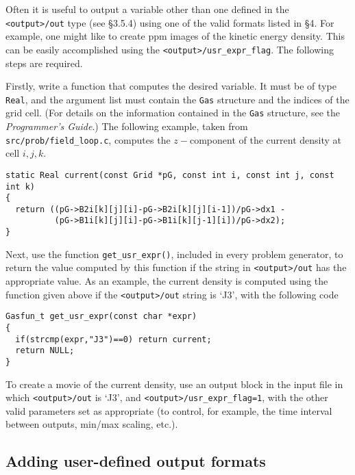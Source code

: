 Often it is useful to output a variable other than one defined in the {\tt <output>/out} type
(see \S3.5.4)  using one of the valid formats listed in \S4.  For example,
one might like to create ppm images of the kinetic energy density.  This
can be easily accomplished using the {\tt <output>/usr\_expr\_flag}.  The
following steps are required.

Firstly, write a function that computes the desired variable.  It must be of
type {\tt Real}, and the argument list must contain the {\tt Gas}
structure and the indices of the grid cell.
(For details on the information contained in the {\tt Gas}
structure, see the {\it Programmer's Guide}.)
The following example, taken from {\tt src/prob/field\_loop.c}, computes the
$z-$component of the current density at cell $i,j,k$.
\begin{verbatim}
static Real current(const Grid *pG, const int i, const int j, const int k)
{
  return ((pG->B2i[k][j][i]-pG->B2i[k][j][i-1])/pG->dx1 -
          (pG->B1i[k][j][i]-pG->B1i[k][j-1][i])/pG->dx2);
}
\end{verbatim}

Next, use the function {\tt get\_usr\_expr()}, included in every
problem generator, to return the value computed by this function if the
string in {\tt <output>/out} has the appropriate value.  As an example,
the current density is computed using the function given above if the
{\tt <output>/out} string is `J3', with the following code
\begin{verbatim}
Gasfun_t get_usr_expr(const char *expr)
{
  if(strcmp(expr,"J3")==0) return current;
  return NULL;
}
\end{verbatim}

To create a movie of the current density, use an output block in the input
file in which {\tt <output>/out} is `J3', and {\tt <output>/usr\_expr\_flag=1},
with the other valid parameters set as appropriate (to control, for
example, the time interval between outputs, min/max scaling, etc.).
 
\subsection{Adding user-defined output formats} 


